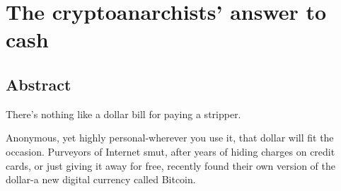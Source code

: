 \documentclass[a4paper,11pt,exjobb]{kth-mag}
\begin{document}

\cleardoublepage
\printbibliography


\cleardoublepage
\appendix
\pagestyle{empty}
\chapter{The cryptoanarchists' answer to cash}
\section{Abstract}
\label{app:abstract}
There's nothing like a dollar bill for paying a stripper. 

Anonymous, yet highly personal-wherever you use it, that dollar will fit the occasion. Purveyors of Internet smut, after years of hiding charges on credit cards, or just giving it away for free, recently found their own version of the dollar-a new digital currency called Bitcoin.

\end{document}
